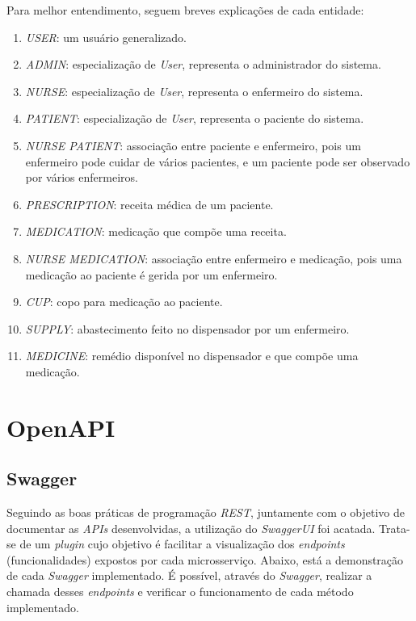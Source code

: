 \begin{apendicesenv}
Para melhor entendimento, seguem breves explicações de cada entidade:

\begin{enumerate}
  \item \textit{USER}: um usuário generalizado.
  \item \textit{ADMIN}: especialização de \textit{User}, representa o administrador do sistema.
  \item \textit{NURSE}: especialização de \textit{User}, representa o enfermeiro do sistema.
  \item \textit{PATIENT}: especialização de \textit{User}, representa o paciente do sistema.
  \item \textit{NURSE PATIENT}: associação entre paciente e enfermeiro, pois um enfermeiro pode cuidar de vários pacientes, e um paciente pode ser observado por vários enfermeiros.
  \item \textit{PRESCRIPTION}: receita médica de um paciente.
  \item \textit{MEDICATION}: medicação que compõe uma receita.
  \item \textit{NURSE MEDICATION}: associação entre enfermeiro e medicação, pois uma medicação ao paciente é gerida por um enfermeiro.
  \item \textit{CUP}: copo para medicação ao paciente.
  \item \textit{SUPPLY}: abastecimento feito no dispensador por um enfermeiro.
  \item \textit{MEDICINE}: remédio disponível no dispensador e que compõe uma medicação.
\end{enumerate}

\chapter{OpenAPI}\label{OpenAPI} %

\section{Swagger}
Seguindo as boas práticas de programação \textit{REST}, juntamente com o objetivo de documentar as \textit{APIs} desenvolvidas, a utilização do \textit{SwaggerUI} foi acatada. Trata-se de um \textit{plugin} cujo objetivo é facilitar a visualização dos \emph{endpoints} (funcionalidades) expostos por cada microsserviço. Abaixo, está a demonstração de cada \textit{Swagger} implementado. É possível, através do \textit{Swagger}, realizar a chamada desses \emph{endpoints} e verificar o funcionamento de cada método implementado. 


\end{apendicesenv}

